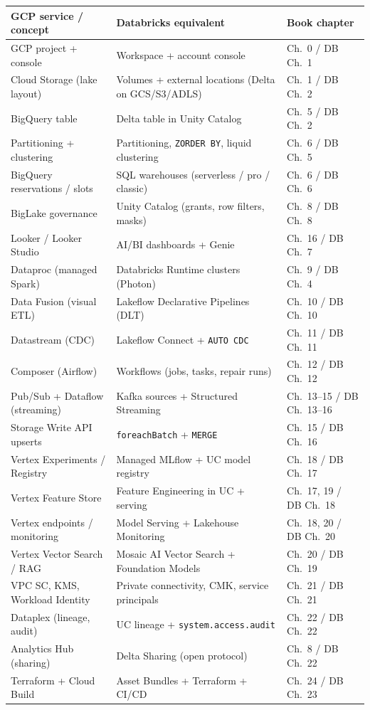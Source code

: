 \begin{center}
\footnotesize
\begin{tabular}{@{}p{4.6cm}p{4.6cm}p{3.6cm}@{}}
\toprule
\textbf{GCP service / concept} & \textbf{Databricks equivalent} & \textbf{Book chapter} \\
\midrule
GCP project + console & Workspace + account console & Ch.~0 / DB Ch.~1 \\
Cloud Storage (lake layout) & Volumes + external locations (Delta on GCS/S3/ADLS) & Ch.~1 / DB Ch.~2 \\
BigQuery table & Delta table in Unity Catalog & Ch.~5 / DB Ch.~2 \\
Partitioning + clustering & Partitioning, \texttt{ZORDER BY}, liquid clustering & Ch.~6 / DB Ch.~5 \\
BigQuery reservations / slots & SQL warehouses (serverless / pro / classic) & Ch.~6 / DB Ch.~6 \\
BigLake governance & Unity Catalog (grants, row filters, masks) & Ch.~8 / DB Ch.~8 \\
Looker / Looker Studio & AI/BI dashboards + Genie & Ch.~16 / DB Ch.~7 \\
Dataproc (managed Spark) & Databricks Runtime clusters (Photon) & Ch.~9 / DB Ch.~4 \\
Data Fusion (visual ETL) & Lakeflow Declarative Pipelines (DLT) & Ch.~10 / DB Ch.~10 \\
Datastream (CDC) & Lakeflow Connect + \texttt{AUTO CDC} & Ch.~11 / DB Ch.~11 \\
Composer (Airflow) & Workflows (jobs, tasks, repair runs) & Ch.~12 / DB Ch.~12 \\
Pub/Sub + Dataflow (streaming) & Kafka sources + Structured Streaming & Ch.~13--15 / DB Ch.~13--16 \\
Storage Write API upserts & \texttt{foreachBatch} + \texttt{MERGE} & Ch.~15 / DB Ch.~16 \\
Vertex Experiments / Registry & Managed MLflow + UC model registry & Ch.~18 / DB Ch.~17 \\
Vertex Feature Store & Feature Engineering in UC + serving & Ch.~17, 19 / DB Ch.~18 \\
Vertex endpoints / monitoring & Model Serving + Lakehouse Monitoring & Ch.~18, 20 / DB Ch.~20 \\
Vertex Vector Search / RAG & Mosaic AI Vector Search + Foundation Models & Ch.~20 / DB Ch.~19 \\
VPC SC, KMS, Workload Identity & Private connectivity, CMK, service principals & Ch.~21 / DB Ch.~21 \\
Dataplex (lineage, audit) & UC lineage + \texttt{system.access.audit} & Ch.~22 / DB Ch.~22 \\
Analytics Hub (sharing) & Delta Sharing (open protocol) & Ch.~8 / DB Ch.~22 \\
Terraform + Cloud Build & Asset Bundles + Terraform + CI/CD & Ch.~24 / DB Ch.~23 \\
\bottomrule
\end{tabular}
\end{center}

